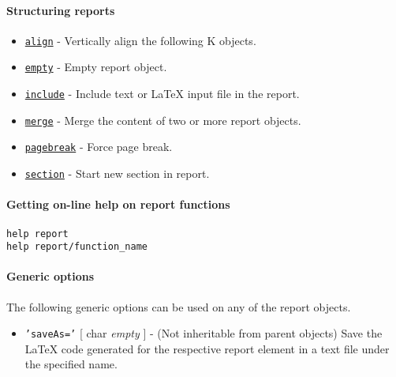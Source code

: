 \paragraph{Structuring reports}\label{structuring-reports}

\begin{itemize}
\itemsep1pt\parskip0pt
\item
  \href{report/align}{\texttt{align}} - Vertically align the following K
  objects.
\item
  \href{report/empty}{\texttt{empty}} - Empty report object.
\item
  \href{report/include}{\texttt{include}} - Include text or LaTeX input
  file in the report.
\item
  \href{report/merge}{\texttt{merge}} - Merge the content of two or more
  report objects.
\item
  \href{report/pagebreak}{\texttt{pagebreak}} - Force page break.
\item
  \href{report/section}{\texttt{section}} - Start new section in report.
\end{itemize}

\paragraph{Getting on-line help on report
functions}\label{getting-on-line-help-on-report-functions}

\begin{verbatim}
help report
help report/function_name
\end{verbatim}

\paragraph{Generic options}\label{generic-options}

The following generic options can be used on any of the report objects.

\begin{itemize}
\itemsep1pt\parskip0pt
\item
  \texttt{'saveAs='} {[} char \textbar{} \emph{empty} {]} - (Not
  inheritable from parent objects) Save the LaTeX code generated for the
  respective report element in a text file under the specified name.
\end{itemize}



